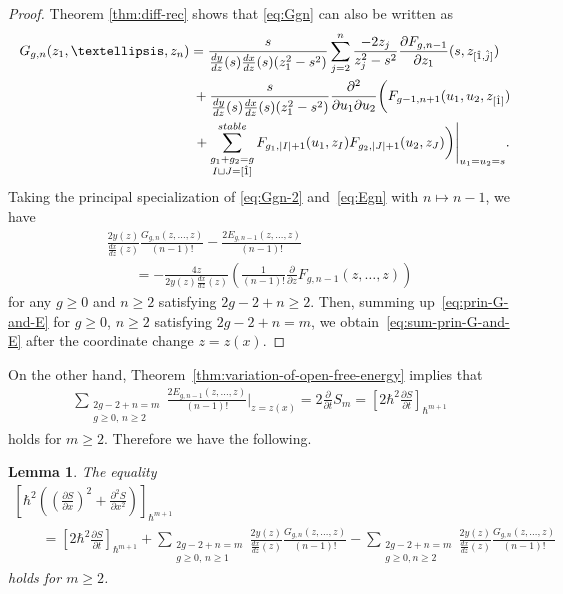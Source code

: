 \documentclass[11pt]{article}
\newtheorem{lem}[thm]{Lemma}
\theoremstyle{definition}
\numberwithin{equation}{section}
\def\p{\partial}
\begin{document}
\begin{proof}
Theorem \ref{thm:diff-rec} shows that
\eqref{eq:Ggn} can also be written as
\begin{gather}
G_{g,n}(z_{1},\dots,z_{n}) =
\frac{s}{\frac{dy}{dz}(s) \frac{dx}{dz}(s)(z_{1}^{2}-s^{2})}
\sum_{j=2}^{n} \frac{-2 z_{j}}{z_{j}^{2}-s^{2}}
\frac{\p F_{g,n-1}}{\p z_{1}}(s,z_{[\hat{1}, \hat{j}]})\nonumber
\\
\hphantom{G_{g,n}(z_{1},\dots,z_{n}) =}{}
+ \frac{s}{\frac{dy}{dz}(s) \frac{dx}{dz}(s)(z_{1}^{2}-s^{2})}
\frac{\p^{2}}{\p u_{1} \p u_{2}}
\biggl( F_{g-1,n+1}(u_{1},u_{2},z_{[\hat{1}]}) \nonumber\\
\hphantom{G_{g,n}(z_{1},\dots,z_{n}) =}{}+
\sum_{\substack{g_{1}+g_{2}=g \\ I \sqcup J = [\hat{1}]}}^{\rm stable}
F_{g_{1}, |I|+1}(u_{1},z_{I}) F_{g_{2}, |J|+1}(u_{2}, z_{J})
\biggr)\Biggr|_{u_{1}=u_{2}=s}.\label{eq:Ggn-2}
\end{gather}
Taking the principal specialization of \eqref{eq:Ggn-2} and~\eqref{eq:Egn} with $n \mapsto n-1$, we have
\begin{gather}
\frac{2y(z)}{\frac{dx}{dz}(z)}
\frac{G_{g,n}(z,\dots,z)}{(n-1)!} -
\frac{2 E_{g,n-1}(z,\dots,z)}{(n-1)!} \nonumber\\
\qquad{} =
- \frac{4z}{2y(z)\frac{dx}{dz}(z)}
\left(\frac{1}{(n-1)!} \frac{\p}{\p z} F_{g,n-1}(z,\dots,z)\right)\label{eq:prin-G-and-E}
\end{gather}
for any $g \ge 0$ and $n \ge 2$ satisfying
$2g-2+n \ge 2$.
Then, summing up~\eqref{eq:prin-G-and-E}
for $g \ge 0$, $n \ge 2$ satisfying $2g-2+n = m$,
we obtain~\eqref{eq:sum-prin-G-and-E} after
the coordinate change $z = z(x)$.
\end{proof}

On the other hand, Theorem~\ref{thm:variation-of-open-free-energy} implies that
\begin{gather*} %
\sum_{\substack{2g-2+n=m \\ g \ge 0,\,  n\ge 2 }}
\frac{2E_{g,n-1}(z,\dots,z)}{(n-1)!} \Biggr|_{z=z(x)}
= 2\frac{\p}{\p t} S_{m}
= \left[ 2\hbar^{2} \frac{\p S}{\p t} \right]_{\hbar^{m+1}}
\end{gather*}
holds for $m \ge 2$.
Therefore we have the following.

\begin{lem} \label{lem:tderivative-and-partial-Riccati}
The equality
\begin{gather*}%
\left[ \hbar^{2}\left( \left(\frac{\p S}{\p x}\right)^{2} +
\frac{\p^{2} S}{\p x^{2}} \right)  \right]_{\hbar^{m+1}} \\
\qquad{} =
\left[ 2\hbar^{2} \frac{\p S}{\p t} \right]_{\hbar^{m+1}} + \sum_{\substack{2g-2+n=m \\ g \ge 0,\, n\ge {1} }}
\frac{2y(z)}{\frac{dx}{dz}(z)}
\frac{G_{g,n}(z,\dots,z)}{(n-1)!} -
\sum_{\substack{2g-2+n=m \\ g \ge 0, n\ge {2} }}
\frac{2y(z)}{\frac{dx}{dz}(z)}
\frac{G_{g,n}(z,\dots,z)}{(n-1)!}
\end{gather*}
holds for $m \ge 2$.
\end{lem}
\end{document}
